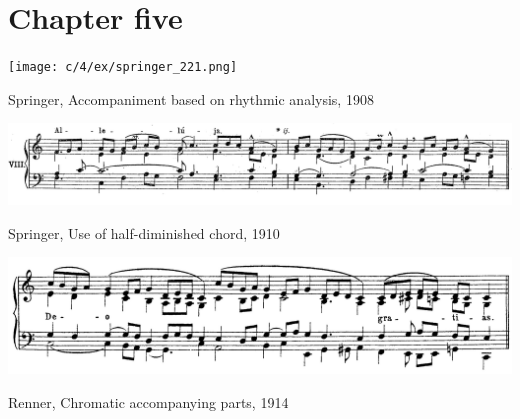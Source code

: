 \clearpage
\section{Chapter five}

%
%


\vspace*{\fill}

\begin{example}
  \centering
  \texttt{[image: c/4/ex/springer\_221.png]}
  \caption{Springer, Accompaniment based on rhythmic analysis, 1908}
  \label{mus:springer_221}
\end{example}

\vspace*{\fill}

\begin{landscape}

  \vspace*{\fill}

  \begin{example}
    \centering
    \includegraphics[width=\linewidth]{c/5/ex/springer_halfdim_16.png}
    \caption{Springer, Use of half-diminished chord, 1910}
    \label{mus:springer_halfdim_16}
  \end{example}

  \vspace*{\fill}

\end{landscape}

  \vspace*{\fill}

  \begin{example}
    \centering
    \includegraphics[width=\linewidth]{c/4/ex/renner_deo_5.png}
    \caption{Renner, Chromatic accompanying parts, 1914}
    \label{mus:renner_deo_5}
  \end{example}

